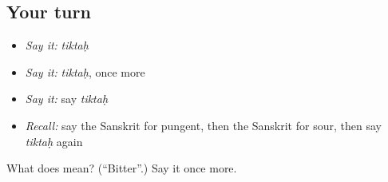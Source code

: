 \subsection*{Your turn}
\begin{itemize}
\raggedright
  \item \emph{Say it:} \emph{tiktaḥ}
  \item \emph{Say it:} \emph{tiktaḥ}, once more
  \item \emph{Say it:} say \emph{tiktaḥ}
  \item \emph{Recall:} say the Sanskrit for pungent, then the Sanskrit for sour, then say \emph{tiktaḥ} again
\end{itemize}

\begin{tcolorbox}[breakable,colback=teal!4,colframe=teal!35!black,title={Before you move on}]
What does  mean? (\textquotedblleft{}Bitter\textquotedblright{}.) Say it once more.
\end{tcolorbox}
